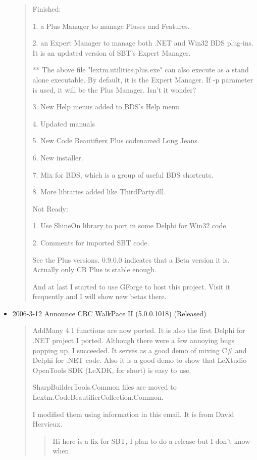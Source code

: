 \begin{itemize}
\begin{quotation}
    Finished:

    1. a Plus Manager to manage Pluses and Features.

    2. an Expert Manager to manage both .NET and Win32 BDS plug-ins. It
    is an updated version of SBT's Expert Manager.

    ** The above file "lextm.utilities.plus.exe" can also execute as a
    stand alone executable. By default, it is the Expert Manager. If -p
    parameter is used, it will be the Plus Manager. Isn't it wonder?

    3. New Help menus added to BDS's Help menu.

    4. Updated manuals

    5. New Code Beautifiers Plus codenamed Long Jeans.

    6. New installer.

    7. Mix for BDS, which is a group of useful BDS shortcuts.

    8. More libraries added like ThirdParty.dll.

    Not Ready:

    1. Use ShineOn library to port in some Delphi for Win32 code.

    2. Comments for imported SBT code.

    See the Plus versions. 0.9.0.0 indicates that a Beta version it is.
    Actually only CB Plus is stable enough.

    And at last I started to use GForge to host this project. Visit it
    frequently and I will show new betas there.
  \end{quotation}
  \item 2006-3-12 Announce CBC WalkPace II (5.0.0.1018) (Released)

  \begin{quotation}
    AddMany 4.1 functions are now ported. It is also the first Delphi
    for .NET project I ported. Although there were a few annoying bugs
    popping up, I succeeded. It serves as a good demo of mixing C\# and
    Delphi for .NET code. Also it is a good demo to show that LeXtudio
    OpenTools SDK (LeXDK, for short) is easy to use.

    Sharp\-Builder\-Tools.Com\-mon files are moved to
    Lextm.Code\-Beauti\-fier\-Col\-lection.Com\-mon.

    I modified them using information in this email. It is from David
    Hervieux.

    \begin{quote}
      Hi here is a fix for SBT, I plan to do a release but I don't know
      when


\end{quote}
\end{quotation}
\end{itemize}
